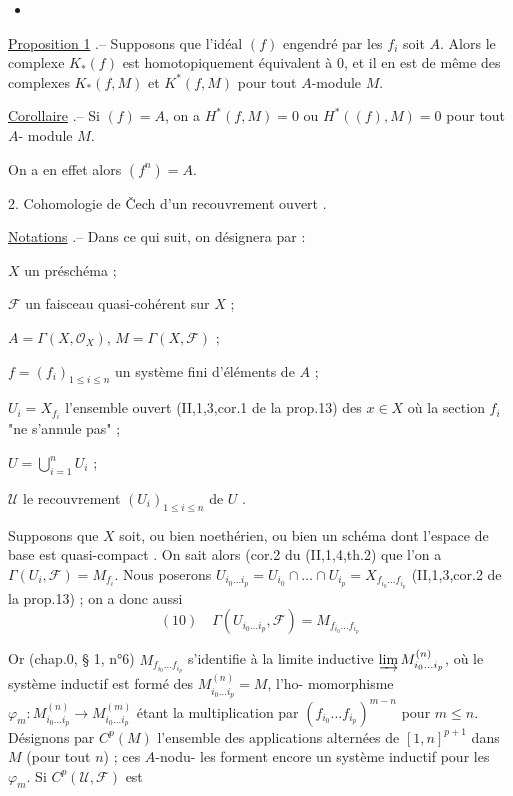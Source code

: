 \newpage


\begin{itemize}
\item[-- III-4 --]
\end{itemize}

\underline{Proposition 1} .-- Supposons que l'idéal $(f)$ engendré par les $f_i$ soit
$A$. Alors le complexe $K_*(f)$ est homotopiquement équivalent à $0$, et
il en est de même des complexes $K_*(f, M)$ et $K^*(f, M)$ pour tout $A$-module
$M$.

\underline{Corollaire} .-- Si $(f)=A$, on a $H^*(f, M)=0$ ou $H^*((f), M)=0$ pour tout $A$-
module $M$.

On a en effet alors $(f^n)=A$.

2. Cohomologie de \v{C}ech d'un recouvrement ouvert .

\underline{Notations} .-- Dans ce qui suit, on désignera par :

$X$ un préschéma ;

$\mathcal{F}$ un faisceau quasi-cohérent sur $X$ ;

$A=\Gamma(X, \mathcal{O}_X)$, $M=\Gamma(X, \mathcal{F})$ ;

$f=(f_i)_{1 \le i \le n}$ un système fini d'éléments de $A$ ;

$U_i = X_{f_i}$ l'ensemble ouvert (II,1,3,cor.1 de la prop.13) des
$x \in X$ où la section $f_i$ "ne s'annule pas" ;

$U = \bigcup_{i=1}^n U_i$ ;

$\mathcal{U}$ le recouvrement $(U_i)_{1 \le i \le n}$ de $U$ .

Supposons que $X$ soit, ou bien noethérien, ou bien un schéma dont
l'espace de base est quasi-compact . On sait alors (cor.2 du
(II,1,4,th.2) que
l'on a $\Gamma(U_i, \mathcal{F})=M_{f_i}$. Nous poserons $U_{i_0 \dots i_p} = U_{i_0} \cap \dots \cap U_{i_p} = X_{f_{i_0} \dots f_{i_p}}$
(II,1,3,cor.2 de la prop.13) ; on a donc aussi
\begin{equation}
(10) \quad \Gamma(U_{i_0 \dots i_p}, \mathcal{F}) = M_{f_{i_0} \dots f_{i_p}}
\end{equation}

Or (chap.0, § 1, n°6) $M_{f_{i_0} \dots f_{i_p}}$ s'identifie à la limite inductive
$\varinjlim M_{i_0 \dots i_p}^{(n)}$, où le système inductif est formé des $M_{i_0 \dots i_p}^{(n)} = M$, l'ho-
momorphisme $\varphi_m : M_{i_0 \dots i_p}^{(n)} \to M_{i_0 \dots i_p}^{(m)}$ étant la multiplication par
$(f_{i_0} \dots f_{i_p})^{m-n}$ pour $m \le n$. Désignons par $C^p(M)$ l'ensemble des
applications alternées de $[1, n]^{p+1}$ dans $M$ (pour tout $n$) ; ces $A$-nodu-
les forment encore un système inductif pour les $\varphi_m$. Si $C^p(\mathcal{U}, \mathcal{F})$ est

